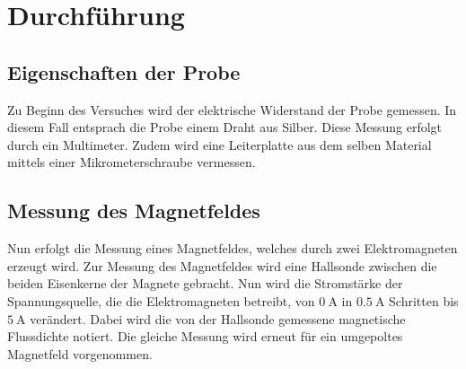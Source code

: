 \section{Durchführung}
\label{sec:Durchführung}
\subsection{Eigenschaften der Probe}
Zu Beginn des Versuches wird der elektrische Widerstand der Probe gemessen. In diesem Fall entsprach die Probe 
einem Draht aus Silber. Diese Messung erfolgt durch ein Multimeter.
Zudem wird eine Leiterplatte aus dem selben Material mittels einer Mikrometerschraube vermessen.
\subsection{Messung des Magnetfeldes}
Nun erfolgt die Messung eines Magnetfeldes, welches durch zwei Elektromagneten erzeugt wird. Zur Messung des 
Magnetfeldes wird eine Hallsonde zwischen die beiden Eisenkerne der Magnete gebracht. Nun wird die Stromstärke der
Spannungsquelle, die die Elektromagneten betreibt, von $\SI{0}{\ampere}$ in $\SI{0.5}{\ampere}$
Schritten bis $\SI{5}{\ampere}$ verändert. Dabei wird die von der Hallsonde gemessene magnetische Flussdichte
notiert. Die gleiche Messung wird erneut für ein umgepoltes Magnetfeld vorgenommen.
